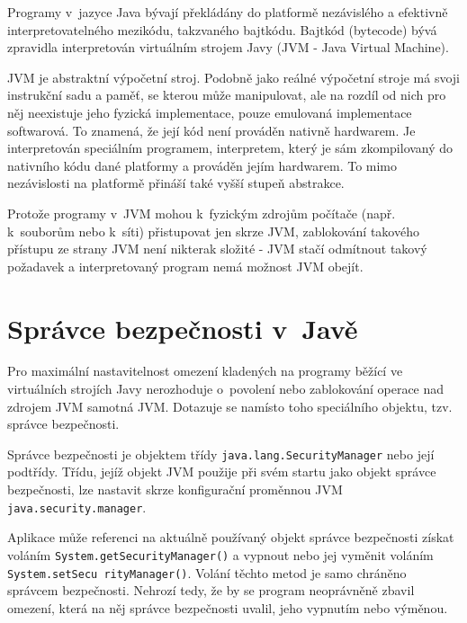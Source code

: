 Programy v~jazyce Java bývají překládány do platformě nezávislého a efektivně interpretovatelného mezikódu, takzvaného bajtkódu.
Bajtkód (bytecode) bývá zpravidla interpretován virtuálním strojem Javy (JVM - Java Virtual Machine).
\cite{jvmIntro}

JVM je abstraktní výpočetní stroj. Podobně jako reálné výpočetní stroje má svoji instrukční sadu a paměť, se kterou může manipulovat, ale na rozdíl od nich pro něj neexistuje jeho fyzická implementace, pouze emulovaná implementace softwarová.
To znamená, že její kód není prováděn nativně hardwarem. Je interpretován speciálním programem, interpretem, který je sám zkompilovaný do nativního kódu dané platformy a prováděn jejím hardwarem.
To mimo nezávislosti na platformě přináší také vyšší stupeň abstrakce.
\cite{jvmIntro}

Protože programy v~JVM mohou k~fyzickým zdrojům počítače (např. k~souborům nebo k~síti) přistupovat jen skrze JVM, zablokování takového přístupu ze strany JVM není nikterak složité - JVM stačí odmítnout takový požadavek a interpretovaný program nemá možnost JVM obejít.

\section{Správce bezpečnosti v~Javě} \label{securityManager}

Pro maximální nastavitelnost omezení kladených na programy běžící ve virtuálních strojích Javy nerozhoduje o~povolení nebo zablokování operace nad zdrojem JVM samotná JVM. Dotazuje se namísto toho speciálního objektu, tzv. správce bezpečnosti.~\cite{tutorialsTSM}

Správce bezpečnosti je objektem třídy {\tt java.lang.SecurityManager} nebo její podtřídy.
Třídu, jejíž objekt JVM použije při svém startu jako objekt správce bezpečnosti, lze nastavit skrze konfigurační proměnnou JVM {\tt java.security.manager}.~\cite{javaSecurityArch}

Aplikace může referenci na aktuálně používaný objekt správce bezpečnosti získat voláním {\tt System.getSecurityManager()} a vypnout nebo jej vyměnit voláním {\tt System.setSecu rityManager()}. Volání těchto metod je samo chráněno správcem bezpečnosti.
Nehrozí tedy, že by se program neoprávněně zbavil omezení, která na něj správce bezpečnosti uvalil, jeho vypnutím nebo výměnou.
\cite{tutorialsTSM}

